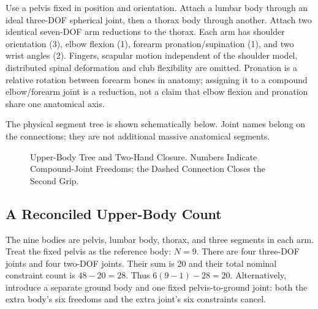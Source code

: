 Use a pelvis fixed in position and orientation. Attach a lumbar body through an ideal three-DOF spherical joint, then a thorax body through another. Attach two identical seven-DOF arm reductions to the thorax. Each arm has shoulder orientation (3), elbow flexion (1), forearm pronation/supination (1), and two wrist angles (2). Fingers, scapular motion independent of the shoulder model, distributed spinal deformation and club flexibility are omitted. Pronation is a relative rotation between forearm bones in anatomy; assigning it to a compound elbow/forearm joint is a reduction, not a claim that elbow flexion and pronation share one anatomical axis.

The physical segment tree is shown schematically below. Joint names belong on the connections; they are not additional massive anatomical segments.

\begin{figure}[htbp]
\centering
{}
\caption{Upper-Body Tree and Two-Hand Closure. Numbers Indicate Compound-Joint Freedoms; the Dashed Connection Closes the Second Grip.}
\label{fig:urdf_tree}
\end{figure}

\subsection{A Reconciled Upper-Body Count}

The nine bodies are pelvis, lumbar body, thorax, and three segments in each arm. Treat the fixed pelvis as the reference body: $N=9$. There are four three-DOF joints and four two-DOF joints. Their sum is 20 and their total nominal constraint count is $48-20=28$. Thus $6(9-1)-28=20$. Alternatively, introduce a separate ground body and one fixed pelvis-to-ground joint: both the extra body's six freedoms and the extra joint's six constraints cancel.

